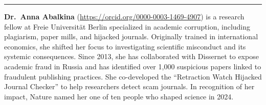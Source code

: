 \begin{center}\rule{0.5\linewidth}{0.5pt}\end{center}

\textbf{Dr.~Anna Abalkina} (\url{https://orcid.org/0000-0003-1469-4907})
is a research fellow at Freie Universität Berlin specialized in academic
corruption, including plagiarism, paper mills, and hijacked journals.
Originally trained in international economics, she shifted her focus to
investigating scientific misconduct and its systemic consequences. Since
2013, she has collaborated with Dissernet to expose academic fraud in
Russia and has identified over 1,000 suspicious papers linked to
fraudulent publishing practices. She co-developed the ``Retraction Watch
Hijacked Journal Checker'' to help researchers detect scam journals. In
recognition of her impact, Nature named her one of ten people who shaped
science in 2024.
